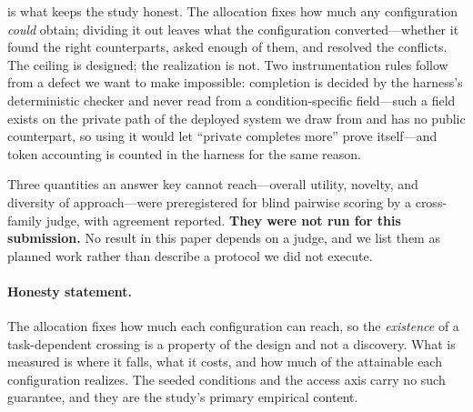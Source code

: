  is what keeps the study honest. The allocation fixes how much any
configuration \emph{could} obtain; dividing it out leaves what the configuration
converted---whether it found the right counterparts, asked enough of them, and resolved
the conflicts. The ceiling is designed; the realization is not. Two instrumentation
rules follow from a defect we want to make impossible: completion is decided by the
harness's deterministic checker and never read from a condition-specific field---such a
field exists on the private path of the deployed system we draw from and has no public
counterpart, so using it would let ``private completes more'' prove itself---and token
accounting is counted in the harness for the same reason.

Three quantities an answer key cannot reach---overall utility, novelty, and diversity
of approach---were preregistered for blind pairwise scoring by a cross-family judge,
with agreement reported. \textbf{They were not run for this submission.} No result in
this paper depends on a judge, and we list them as planned work rather than describe a
protocol we did not execute.

\paragraph{Honesty statement.} The allocation fixes how much each configuration can
reach, so the \emph{existence} of a task-dependent crossing is a property of the design
and not a discovery. What is measured is where it falls, what it costs, and how much of
the attainable each configuration realizes. The seeded conditions and the access axis
carry no such guarantee, and they are the study's primary empirical content.
